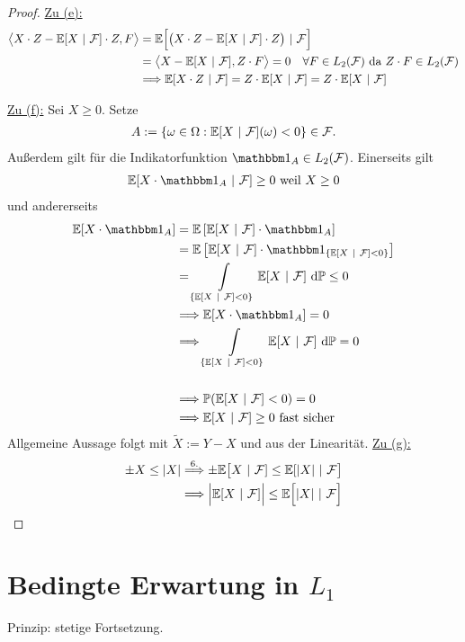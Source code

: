 \begin{proof}
	\underline{Zu (e):} 
	\begin{align*}
		\big\langle X\cdot Z-\mathbb{E}[X~|~\mathcal{F}]\cdot Z,F\big\rangle
		&=\mathbb{E}\Big[\big(X\cdot Z-\mathbb{E}[X~|~\mathcal{F}]\cdot Z\big)~|~\mathcal{F}\Big]\\
		&=\big\langle X-\mathbb{E}[X~|~\mathcal{F}],Z\cdot F\big\rangle=0\quad\forall F\in L_2(\mathcal{F})\text{ da }Z\cdot F\in L_2(\mathcal{F})\\
		&\Longrightarrow\mathbb{E}[X\cdot Z~|~\mathcal{F}]
		=Z\cdot \mathbb{E}[X~|~\mathcal{F}]
		=Z\cdot\mathbb{E}[X~|~\mathcal{F}]
	\end{align*}

	\underline{Zu (f):} Sei $X\geq0$. Setze
	\begin{align*}
		A:=\lbrace\omega\in\Omega:\mathbb{E}[X~|~\mathcal{F}](\omega)<0\rbrace\in\mathcal{F}.
	\end{align*}
	Außerdem gilt für die Indikatorfunktion $\indi_A\in L_2(\mathcal{F})$.
	Einerseits gilt
	\begin{align*}
		\E[X\cdot\indi_A~|~\mathcal{F}]\geq0\text{ weil }X\geq0
	\end{align*}
	und andererseits
	\begin{align*}
		\E[X\cdot\indi_A]
		&=\E\left[\E[X~|~\mathcal{F}]\cdot\indi_A\right]\\
		&=\E\left[\E[X~|~\mathcal{F}]\cdot\indi_{\lbrace\E[X~|~\mathcal{F}]<0\rbrace}\right]\\
		&=\int\limits_{\lbrace\E[X~|~\mathcal{F}]<0\rbrace} \E[X~|~\mathcal{F}]\d\P\leq0\\
		&\Longrightarrow\E[X\cdot\indi_A]=0\\
		&\Longrightarrow\int\limits_{\lbrace\E[X~|~\mathcal{F}]<0\rbrace} \E[X~|~\mathcal{F}]\d\P=0\\\\
		&\Longrightarrow \P(\E[X~|~\mathcal{F}]<0)=0\\
		&\Longrightarrow\E[X~|~\mathcal{F}]\geq0\text { fast sicher}
	\end{align*}
	Allgemeine Aussage folgt mit $\tilde{X}:=Y-X$ und aus der Linearität.\nl
	\underline{Zu (g):}
	\begin{align*}
		\pm X\leq|X|
		\stackrel{6.}{\Longrightarrow}
		\pm\mathbb{E}\big[X~|~\mathcal{F}]\leq\mathbb{E}[|X|~|~\mathcal{F}\big]\\
		\Longrightarrow\Big|\mathbb{E}[X~|~\mathcal{F}]\Big|\leq\mathbb{E}\Big[|X|~|~\mathcal{F}\Big]
	\end{align*}
\end{proof}
 
\section{Bedingte Erwartung in \texorpdfstring{$L_1$}{L\_1}}
\setcounter{section}{1}
Prinzip: stetige Fortsetzung.

